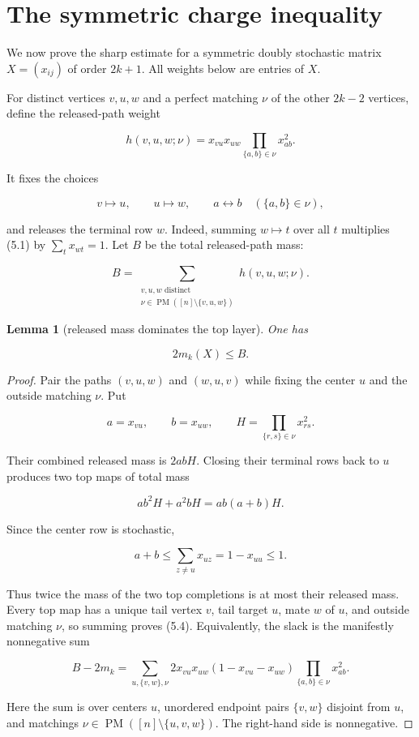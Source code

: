 \documentclass[11pt]{article}
\newtheorem{lemma}[theorem]{Lemma}
\theoremstyle{remark}
\begin{document}
\section{The symmetric charge inequality}

We now prove the sharp estimate for a symmetric doubly stochastic matrix
$X=(x_{ij})$ of order $2k+1$. All weights below are entries of $X$.

For distinct vertices $v,u,w$ and a perfect matching $\nu$ of the other
$2k-2$ vertices, define the released-path weight

\[
h(v,u,w;\nu)
=x_{vu}x_{uw}\prod_{\{a,b\}\in\nu}x_{ab}^2.
\tag{5.1}
\]

It fixes the choices

\[
v\longmapsto u,
\qquad u\longmapsto w,
\qquad a\longleftrightarrow b\quad(\{a,b\}\in\nu),
\tag{5.2}
\]

and releases the terminal row $w$. Indeed, summing $w\mapsto t$ over all
$t$ multiplies (5.1) by $\sum_t x_{wt}=1$. Let $B$ be the total
released-path mass:

\[
B=\sum_{\substack{v,u,w\text{ distinct}\\
\nu\in\operatorname{PM}([n]\setminus\{v,u,w\})}}
h(v,u,w;\nu).
\tag{5.3}
\]

\begin{lemma}[released mass dominates the top layer]
One has

\[
2m_k(X)\le B.
\tag{5.4}
\]

\end{lemma}

\begin{proof}
Pair the paths $(v,u,w)$ and $(w,u,v)$ while fixing the center $u$
and the outside matching $\nu$. Put

\[
a=x_{vu},\qquad b=x_{uw},\qquad
H=\prod_{\{r,s\}\in\nu}x_{rs}^2.
\]

Their combined released mass is $2abH$. Closing their terminal rows back to
$u$ produces two top maps of total mass

\[
ab^2H+a^2bH=ab(a+b)H.
\]

Since the center row is stochastic,

\[
a+b\le\sum_{z\ne u}x_{uz}=1-x_{uu}\le1.
\]

Thus twice the mass of the two top completions is at most their released
mass. Every top map has a unique tail vertex $v$, tail target $u$, mate $w$
of $u$, and outside matching $\nu$, so summing proves (5.4). Equivalently,
the slack is the manifestly nonnegative sum

\[
B-2m_k
=\sum_{u,\{v,w\},\nu}
2x_{vu}x_{uw}(1-x_{vu}-x_{uw})
\prod_{\{a,b\}\in\nu}x_{ab}^2.
\tag{5.5}
\]

Here the sum is over centers $u$, unordered endpoint pairs $\{v,w\}$
disjoint from $u$, and matchings
$\nu\in\operatorname{PM}([n]\setminus\{u,v,w\})$. The right-hand side is
nonnegative.
\end{proof}
\end{document}
